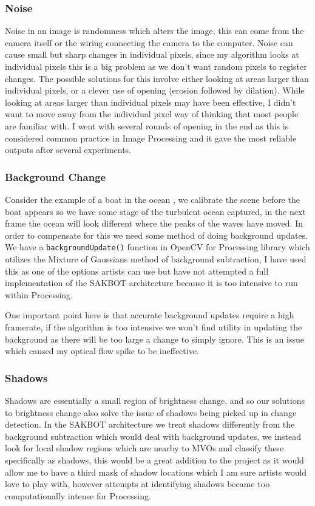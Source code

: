 \documentclass[a4paper]{report}
\begin{document}
\subsubsection{Noise}
Noise in an image is randomness which alters the image, this can come from the camera itself or the wiring connecting the camera to the computer. Noise can cause small but sharp changes in individual pixels, since my algorithm looks at individual pixels this is a big problem as we don't want random pixels to register changes. The possible solutions for this involve either looking at areas larger than individual pixels, or a clever use of opening (erosion followed by dilation). While looking at areas larger than individual pixels may have been effective, I didn't want to move away from the individual pixel way of thinking that most people are familiar with. I went with several rounds of opening in the end as this is considered common practice in Image Processing and it gave the most reliable outputs after several experiments.

\subsubsection{Background Change}
Consider the example of a boat in the ocean , we calibrate the scene before the boat appears so we have some stage of the turbulent ocean captured, in the next frame the ocean will look different where the peaks of the waves have moved. In order to compensate for this we need some method of doing background updates. We have a \verb|backgroundUpdate()| function in OpenCV for Processing library\cite{OPENCV} which utilizes the Mixture of Gaussians method of background subtraction, I have used this as one of the options artists can use but have not attempted a full implementation of the SAKBOT architecture\cite{SAKBOT} because it is too intensive to run within Processing\cite{PROCESSING}.

One important point here is that accurate background updates require a high framerate, if the algorithm is too intensive we won't find utility in updating the background as there will be too large a change to simply ignore. This is an issue which caused my optical flow spike to be ineffective.

\subsubsection{Shadows}
Shadows are essentially a small region of brightness change, and so our solutions to brightness change also solve the issue of shadows being picked up in change detection. In the SAKBOT architecture\cite{SAKBOT} we treat shadows differently from the background subtraction which would deal with background updates, we instead look for local shadow regions which are nearby to MVOs and classify these specifically as shadows, this would be a great addition to the project as it would allow me to have a third mask of shadow locations which I am sure artists would love to play with, however attempts at identifying shadows became too computationally intense for Processing\cite{PROCESSING}.
\end{document}
